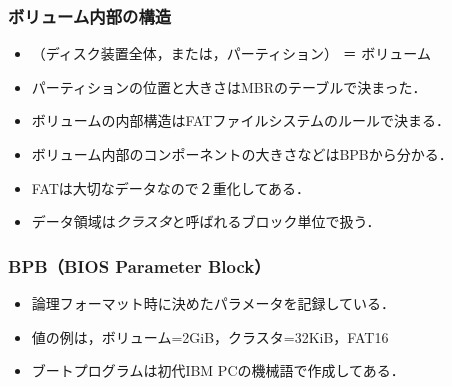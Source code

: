 \documentclass[unicode,handout]{beamer}                   %
\begin{document}
\begin{frame}
  \frametitle{ボリューム内部の構造}
  \vfill
  \begin{itemize}
  \item （ディスク装置全体，または，パーティション） ＝ ボリューム
  \item パーティションの位置と大きさはMBRのテーブルで決まった．
  \item ボリュームの内部構造はFATファイルシステムのルールで決まる．
  \item ボリューム内部のコンポーネントの大きさなどはBPBから分かる．
  \item FATは大切なデータなので２重化してある．
  \item データ領域は\emph{クラスタ}と呼ばれるブロック単位で扱う．
  \end{itemize}
  \vfill
\end{frame}

\begin{frame}
  \frametitle{BPB（BIOS Parameter Block）}
  \begin{itemize}
  \item 論理フォーマット時に決めたパラメータを記録している．
  \item 値の例は，ボリューム=2GiB，クラスタ=32KiB，FAT16
  \item ブートプログラムは初代IBM PCの機械語で作成してある．
  \end{itemize}
  \vfill
\end{frame}
\end{document}
